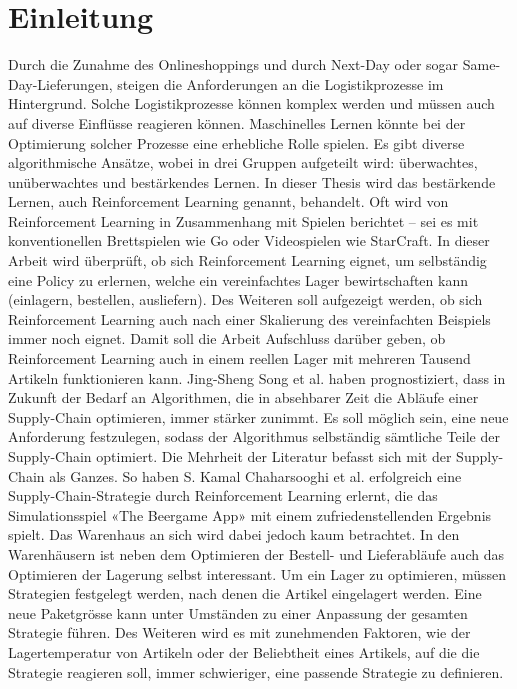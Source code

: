 \chapter{Einleitung}
Durch die Zunahme des Onlineshoppings und durch Next-Day oder sogar Same-Day-Lieferungen, steigen die Anforderungen an die Logistikprozesse im Hintergrund. Solche Logistikprozesse können komplex werden und müssen auch auf diverse Einflüsse reagieren können. 
Maschinelles Lernen könnte bei der Optimierung solcher Prozesse eine erhebliche Rolle spielen. Es gibt diverse algorithmische Ansätze, wobei in drei Gruppen aufgeteilt wird: überwachtes, unüberwachtes und bestärkendes Lernen. 
In dieser Thesis wird das bestärkende Lernen, auch Reinforcement Learning genannt, behandelt. Oft wird von Reinforcement Learning in Zusammenhang mit Spielen berichtet – sei es mit konventionellen Brettspielen wie Go oder Videospielen wie StarCraft. In dieser Arbeit wird überprüft, ob sich Reinforcement Learning eignet, um selbständig eine Policy zu erlernen, welche ein vereinfachtes Lager bewirtschaften kann (einlagern, bestellen, ausliefern). Des Weiteren soll aufgezeigt werden, ob sich Reinforcement Learning auch nach einer Skalierung des vereinfachten Beispiels immer noch eignet. Damit soll die Arbeit Aufschluss darüber geben, ob Reinforcement Learning auch in einem reellen Lager mit mehreren Tausend Artikeln funktionieren kann.
Jing-Sheng Song et al. \cite{inventory_management} haben prognostiziert, dass in Zukunft der Bedarf an Algorithmen, die in absehbarer Zeit die Abläufe einer Supply-Chain optimieren, immer stärker zunimmt. Es soll möglich sein, eine neue Anforderung festzulegen, sodass der Algorithmus selbständig sämtliche Teile der Supply-Chain optimiert. Die Mehrheit der Literatur befasst sich mit der Supply-Chain als Ganzes. So haben S. Kamal Chaharsooghi et al. \cite{rl_supply} erfolgreich eine Supply-Chain-Strategie durch Reinforcement Learning erlernt, die das Simulationsspiel «The Beergame App» mit einem zufriedenstellenden Ergebnis spielt. Das Warenhaus an sich wird dabei jedoch kaum betrachtet. In den Warenhäusern ist neben dem Optimieren der Bestell- und Lieferabläufe auch das Optimieren der Lagerung selbst interessant. Um ein Lager zu optimieren, müssen Strategien festgelegt werden, nach denen die Artikel eingelagert werden. Eine neue Paketgrösse kann unter Umständen zu einer Anpassung der gesamten Strategie führen. Des Weiteren wird es mit zunehmenden Faktoren, wie der Lagertemperatur von Artikeln oder der Beliebtheit eines Artikels, auf die die Strategie reagieren soll, immer schwieriger, eine passende Strategie zu definieren.

